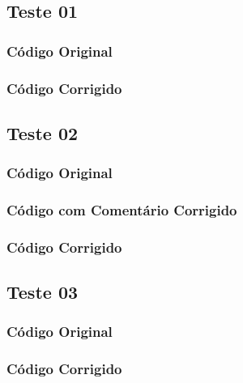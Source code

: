 \subsection{Teste 01}
\label{subsec:lexicoTeste01}

\subsubsection{Código Original}


\subsubsection{Código Corrigido}


\subsection{Teste 02}
\label{subsec:lexicoTeste02}

\subsubsection{Código Original}


\subsubsection{Código com Comentário Corrigido}


\subsubsection{Código Corrigido}


\subsection{Teste 03}
\label{subsec:lexicoTeste03}

\subsubsection{Código Original}


\subsubsection{Código Corrigido}


